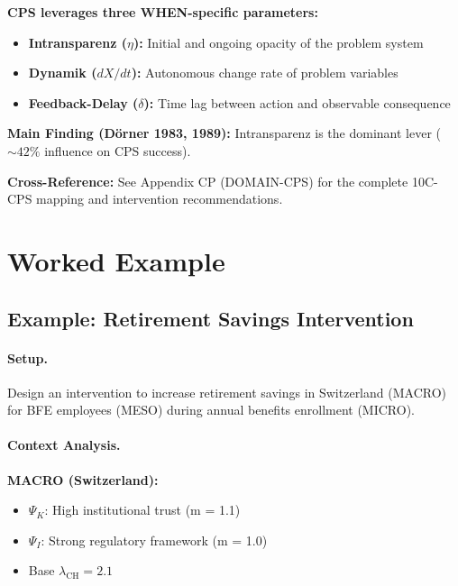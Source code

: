 \begin{tcolorbox}[colback=green!5!white, colframe=green!75!black,
    title=Application Domain: Complex Problem Solving (CP)]
\textbf{CPS leverages three WHEN-specific parameters:}
\begin{itemize}[nosep]
\item \textbf{Intransparenz ($\eta$):} Initial and ongoing opacity of the problem system
\item \textbf{Dynamik ($dX/dt$):} Autonomous change rate of problem variables
\item \textbf{Feedback-Delay ($\delta$):} Time lag between action and observable consequence
\end{itemize}

\textbf{Main Finding (Dörner 1983, 1989):} Intransparenz is the dominant lever ($\sim 42\%$ influence on CPS success).

\textbf{Cross-Reference:} See Appendix CP (DOMAIN-CPS) for the complete 10C-CPS mapping and intervention recommendations.
\end{tcolorbox}


\section{Worked Example}
\label{sec:when-example}

\subsection{Example: Retirement Savings Intervention}

\paragraph{Setup.}
Design an intervention to increase retirement savings in Switzerland (MACRO)
for BFE employees (MESO) during annual benefits enrollment (MICRO).

\paragraph{Context Analysis.}

\textbf{MACRO (Switzerland):}
\begin{itemize}[nosep]
\item $\Psi_K$: High institutional trust (m = 1.1)
\item $\Psi_I$: Strong regulatory framework (m = 1.0)
\item Base $\lambda_{\text{CH}} = 2.1$
\end{itemize}

